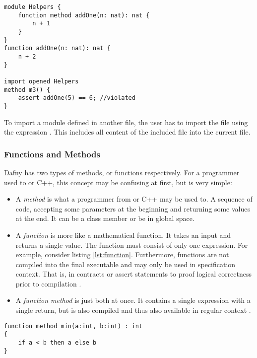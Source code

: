 \begin{lstlisting}[language = dafny, caption={Naming Clash}, captionpos=b, label={lst:moduleShadowing}]
module Helpers {
    function method addOne(n: nat): nat {
        n + 1
    }
}
function addOne(n: nat): nat {
    n + 2
}

import opened Helpers
method m3() {
    assert addOne(5) == 6; //violated
}
\end{lstlisting}

To import a module defined in another file, the user has to import the file using the expression .
This includes all content of the included file into the current file.

\subsubsection{Functions and Methods}
Dafny has two types of methods, or functions respectively.
For a programmer used to \CsharpWithSpace or C++, this concept may be confusing at first, but is very simple:
\begin{itemize}
\item A \textit{method} is what a programmer from \CsharpWithSpace or C++ may be used to.
A sequence of code, accepting some parameters at the beginning and returning some values at the end.
It can be a class member or be in global space.
\item A \textit{function} is more like a mathematical function.
It takes an input and returns a single value.
The function must consist of only one expression.
For example, consider listing \ref{lst:function}.
Furthermore, functions are not compiled into the final executable and may only be used in specification context.
That is, in contracts or assert statements to proof logical correctness prior to compilation \cite{functionVSMethod}.
\item A \textit{function method} is just both at once.
It contains a single expression with a single return, but is also compiled and thus also available in regular context \cite{functionVSMethod}.
\end{itemize}


\begin{lstlisting}[language=dafny, caption={Function Method Example}, captionpos=b, label={lst:function}]
function method min(a:int, b:int) : int
{
    if a < b then a else b
}
\end{lstlisting}

